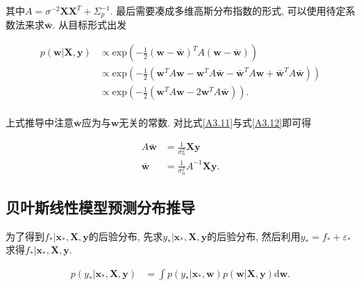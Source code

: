         其中$A=\sigma^{-2}\boldsymbol{X}\boldsymbol{X}^{T} + \Sigma^{-1}_{p}$. 最后需要凑成多维高斯分布指数的形式, 可以使用待定系数法来求$\boldsymbol{\bar{w}}$. 从目标形式出发

        \begin{equation}\label{A3.12}
            \begin{aligned}
                p(\boldsymbol{w}|\boldsymbol{X},\boldsymbol{y})
                &\propto \mathrm{exp}\left( -\frac{1}{2}(\boldsymbol{w}-\boldsymbol{\bar{w}})^{T}A(\boldsymbol{w}-\boldsymbol{\bar{w}}) \right) \\
                &\propto \mathrm{exp}\left( -\frac{1}{2}(\boldsymbol{w}^{T}A\boldsymbol{w} - \boldsymbol{w}^{T}A\boldsymbol{\bar{w}} - \boldsymbol{\bar{w}}^{T}A\boldsymbol{w} + \boldsymbol{\bar{w}}^{T}A\boldsymbol{\bar{w}}) \right) \\
                &\propto \mathrm{exp}\left( -\frac{1}{2}(\boldsymbol{w}^{T}A\boldsymbol{w} - 2\boldsymbol{w}^{T}A\boldsymbol{\bar{w}}) \right). \\
            \end{aligned}
        \end{equation}

        上式推导中注意$\boldsymbol{\bar{w}}$应为与$\boldsymbol{w}$无关的常数. 对比式\ref{A3.11}与式\ref{A3.12}即可得

        \begin{equation}
            \begin{aligned}
                A\boldsymbol{\bar{w}}&=\frac{1}{\sigma^{2}_{n}}\boldsymbol{Xy} \\
                \boldsymbol{\bar{w}}&=\frac{1}{\sigma^{2}_{n}}A^{-1}\boldsymbol{Xy}.
            \end{aligned}
        \end{equation}

    \subsection{贝叶斯线性模型预测分布推导} \label{A.4}


        为了得到$f_{*}|\boldsymbol{x}_{*},\boldsymbol{X},\boldsymbol{y}$的后验分布, 先求$y_{*}|\boldsymbol{x}_{*},\boldsymbol{X},\boldsymbol{y}$的后验分布, 然后利用$y_{*}=f_{*}+\varepsilon_{*}$求得$f_{*}|\boldsymbol{x}_{*},\boldsymbol{X},\boldsymbol{y}$.

        \begin{equation} \label{A4.14}
            \begin{aligned}
            p(y_{*}|\boldsymbol{x}_{*},\boldsymbol{X},\boldsymbol{y})
            &=\int p(y_{*}|\boldsymbol{x}_{*},\boldsymbol{w})p(\boldsymbol{w}|\boldsymbol{X},\boldsymbol{y}) \mathrm{d}\boldsymbol{w}. \\
            \end{aligned}
        \end{equation}

